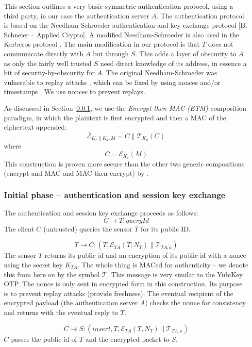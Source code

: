 This section outlines a very basic symmetric authentication protocol, using a third party, in our case the authentication server $A$. The authentication protocol is based on the Needham-Schroeder authentication and key exchange protocol  [B. Schneier -- Applied Crypto]. A modified Needham-Schroeder is also used in the Kerberos protocol . The main modification in our protocol is that $T$ does not communicate directly with $A$ but through $S$. This adds a layer of obscurity to $A$ as only the fairly well trusted $S$ need direct knowledge of its address, in essence a bit of security-by-obscurity for $A$.
%
The original Needham-Schroeder was vulnerable to replay attacks , which can be fixed by using nonces and/or timestamps \cite{needham1987}. We use nonces to prevent replays.

As discussed in Section~\ref{}, we use the \textit{Encrypt-then-MAC (ETM)}  composition paradigm, in which the plaintext is first encrypted and then a MAC of the ciphertext appended:
\[
\bar{\mathcal{E}}_{K_e \parallel K_a, M} = C \parallel \mathcal{T}_{K_a}(C)
\]
where
\[
C = \mathcal{E}_{K_e}(M)
\]
This construction is proven more secure than the other two generic compositions (encrypt-and-MAC and MAC-then-encrypt) by \citeauthor{bellare2007}. 

\subsubsection{Initial phase -- authentication and session key exchange}

The authentication and session key exchange proceeds as follows:
\[
C \rightarrow T: \textit{queryId}
\]
The client $C$ (untrusted) queries the sensor $T$ for its public ID.

\[
T \rightarrow C: (T,\mathcal{E}_{TA}(T,N_T) \parallel \mathcal{T}_{TA,a})
\]
The sensor $T$ returns its public id and an encryption of its public id with a nonce using the secret key $K_{TA}$. The whole thing is MACed for authenticity -- we denote this from here on by the symbol $\mathcal{T}$. This message is very similar to the YubiKey OTP. The nonce is only sent in encrypted form in this construction. Its purpose is to prevent replay attacks (provide freshness). The eventual recipient of the encrypted payload (the authentication server $A$) checks the nonce for consistency and returns with the eventual reply to $T$.

\[
C\rightarrow S: (insert,T,\mathcal{E}_{TA}(T,N_T) \parallel \mathcal{T}_{TA,a})
\]
$C$ passes the public id of $T$ and the encrypted packet to $S$.

